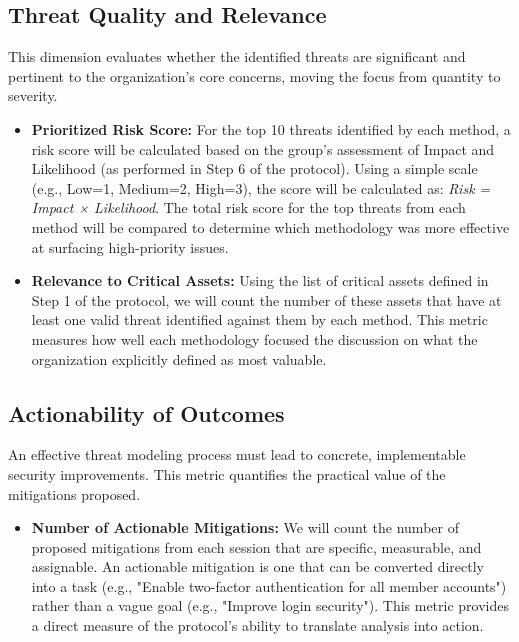 \subsection{Threat Quality and Relevance}
\label{subsec:threat_quality_and_relevance}

This dimension evaluates whether the identified threats are significant and
pertinent to the organization's core concerns, moving the focus from quantity to
severity.

\begin{itemize}
\item \textbf{Prioritized Risk Score:} For the top 10 threats identified by each
method, a risk score will be calculated based on the group's assessment of
Impact and Likelihood (as performed in Step 6 of the protocol). Using a simple
scale (e.g., Low=1, Medium=2, High=3), the score will be calculated as:
\textit{Risk = Impact × Likelihood}. The total risk score for the top threats
from each method will be compared to determine which methodology was more
effective at surfacing high-priority issues.
\item \textbf{Relevance to Critical Assets:} Using the list of critical assets
defined in Step 1 of the protocol, we will count the number of these assets that
have at least one valid threat identified against them by each method. This
metric measures how well each methodology focused the discussion on what the
organization explicitly defined as most valuable.
\end{itemize}

\subsection{Actionability of Outcomes}
\label{subsec:actionability_of_outcomes}
An effective threat modeling process must lead to concrete, implementable
security improvements. This metric quantifies the practical value of the
mitigations proposed.
\begin{itemize}
\item \textbf{Number of Actionable Mitigations:} We will count the number of
proposed mitigations from each session that are specific, measurable, and
assignable. An actionable mitigation is one that can be converted directly into
a task (e.g., "Enable two-factor authentication for all member accounts") rather
than a vague goal (e.g., "Improve login security"). This metric provides a
direct measure of the protocol's ability to translate analysis into action.
\end{itemize}

